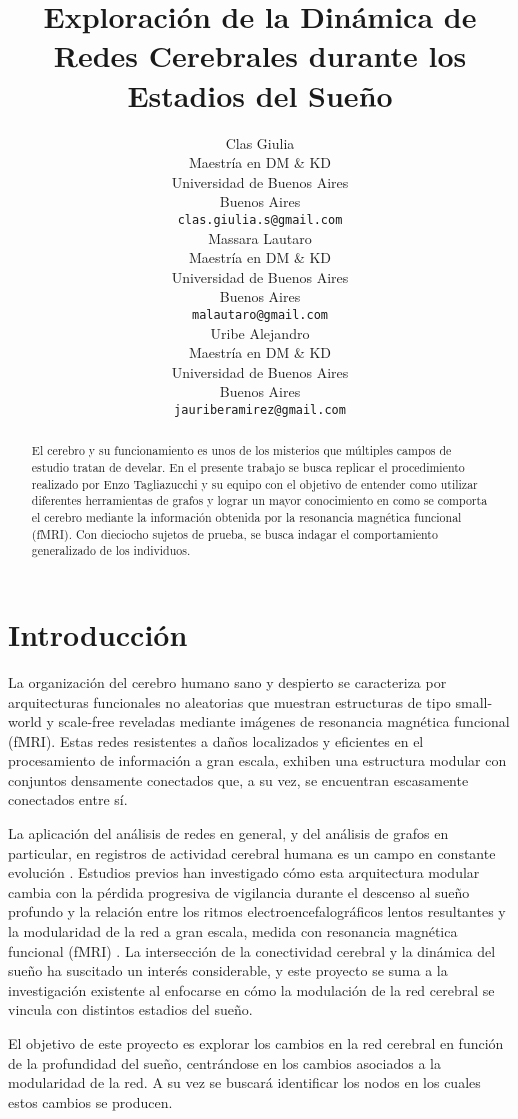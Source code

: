 \documentclass{article}
\title{Exploración de la Dinámica de Redes Cerebrales durante los Estadios del Sueño}
\author{
    Clas Giulia\\
    Maestría en DM \& KD\\
    Universidad de Buenos Aires\\
    Buenos Aires\\
    \texttt{clas.giulia.s@gmail.com} \\
    \And
    Massara Lautaro\\
    Maestría en DM \& KD\\
    Universidad de Buenos Aires\\
    Buenos Aires\\
    \texttt{malautaro@gmail.com} \\
    \And
    Uribe Alejandro \\
    Maestría en DM \& KD\\
    Universidad de Buenos Aires\\
    Buenos Aires\\
    \texttt{jauriberamirez@gmail.com}
}
\begin{document}
\maketitle

\begin{abstract}
El cerebro y su funcionamiento es unos de los misterios que múltiples campos de estudio tratan de develar. En el presente trabajo se busca replicar el procedimiento realizado por Enzo Tagliazucchi \cite{Tagliazucchi:2013aa} y su equipo con el objetivo de entender como utilizar diferentes herramientas de grafos y lograr un mayor conocimiento en como se comporta el cerebro mediante la información obtenida por la resonancia magnética funcional (fMRI). Con dieciocho sujetos de prueba, se busca indagar el comportamiento generalizado de los individuos.
\end{abstract}


\section{Introducción}

La organización del cerebro humano sano y despierto se caracteriza por arquitecturas funcionales no aleatorias que muestran estructuras de tipo small-world y scale-free reveladas mediante imágenes de resonancia magnética funcional (fMRI). Estas redes resistentes a daños localizados y eficientes en el procesamiento de información a gran escala, exhiben una estructura modular con conjuntos densamente conectados que, a su vez, se encuentran escasamente conectados entre sí.

La aplicación del análisis de redes en general, y del análisis de grafos en particular, en registros de actividad cerebral humana es un campo en constante evolución \cite{Rubinov:2010aa, Pachon_2016}. Estudios previos han investigado cómo esta arquitectura modular cambia con la pérdida progresiva de vigilancia durante el descenso al sueño profundo y la relación entre los ritmos electroencefalográficos lentos resultantes y la modularidad de la red a gran escala, medida con resonancia magnética funcional  (fMRI) \cite{Tagliazucchi:2013aa}. La intersección de la conectividad cerebral y la dinámica del sueño ha suscitado un interés considerable, y este proyecto se suma a la investigación existente al enfocarse en cómo la modulación de la red cerebral se vincula con distintos estadios del sueño.

El objetivo de este proyecto es explorar los cambios en la red cerebral en función de la profundidad del sueño, centrándose en los cambios asociados a la modularidad de la red. A su vez se buscará identificar los nodos en los cuales estos cambios se producen.
\end{document}
